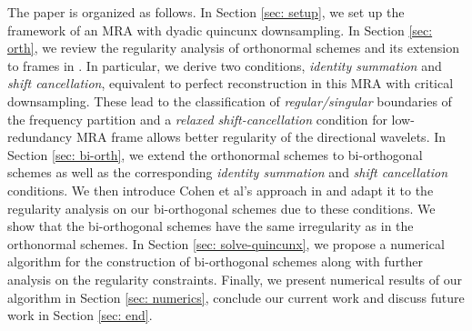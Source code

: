 The paper is organized as follows. In Section \ref{sec: setup}, we set up the framework of an MRA with dyadic quincunx downsampling. In Section \ref{sec: orth}, we review the regularity analysis of orthonormal schemes and its extension to frames in \cite{yin2014orthshear}. In particular, we derive two conditions, {\it identity summation} and {\it shift cancellation}, equivalent to perfect reconstruction in this MRA with critical downsampling. These lead to the classification of {\it regular/singular} boundaries of the frequency partition %
and a {\it relaxed shift-cancellation} condition for low-redundancy MRA frame allows better regularity of the directional wavelets. 
In Section \ref{sec: bi-orth}, we extend the orthonormal schemes to bi-orthogonal schemes as well as the corresponding {\it identity summation} and {\it shift cancellation} conditions. We then introduce Cohen et al's approach in \cite{cohen1993compactly} and adapt it to the regularity analysis on our bi-orthogonal schemes due to these conditions. We show that the bi-orthogonal schemes have the same irregularity as in the orthonormal schemes.
In Section \ref{sec: solve-quincunx}, we  propose a numerical algorithm for the construction of bi-orthogonal schemes along with further analysis on the regularity constraints.
Finally, we present numerical results of our algorithm in Section \ref{sec: numerics}, conclude our current work and discuss future work in Section \ref{sec: end}.
